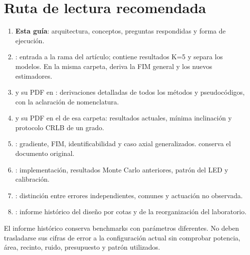 \documentclass[11pt,a4paper]{article}
\begin{document}
\section{Ruta de lectura recomendada}
\begin{enumerate}
\item \textbf{Esta guía}: arquitectura, conceptos, preguntas respondidas y forma de ejecución.
\item {}: entrada a la rama del artículo; contiene resultados K=5 y separa los modelos. En la misma carpeta,  deriva la FIM general y  los nuevos estimadores.
\item {} y su PDF en : derivaciones detalladas de todos los métodos y pseudocódigos, con la aclaración de nomenclatura.
\item {} y su PDF en el  de esa carpeta: resultados actuales, mínima inclinación y protocolo CRLB de un grado.
\item {}: gradiente, FIM, identificabilidad y caso axial generalizados.  conserva el documento original.
\item {}: implementación, resultados Monte Carlo anteriores, patrón del LED y calibración.
\item {}: distinción entre errores independientes, comunes y actuación no observada.
\item {}: informe histórico del diseño por cotas y de la reorganización del laboratorio.
\end{enumerate}
El informe histórico conserva benchmarks con parámetros diferentes. No deben trasladarse sus cifras de error a la configuración actual sin comprobar potencia, área, recinto, ruido, presupuesto y patrón utilizados.
\end{document}
